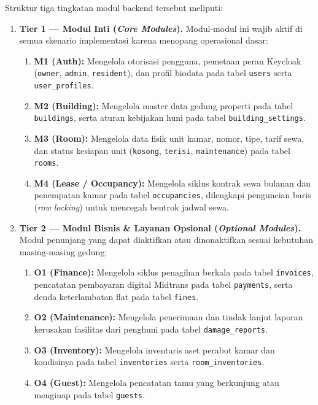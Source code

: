 Struktur tiga tingkatan modul backend tersebut meliputi:
\begin{enumerate}[label=\arabic*., leftmargin=*]
  \item \textbf{Tier 1 --- Modul Inti (\textit{Core Modules}).} Modul-modul ini wajib aktif di semua skenario implementasi karena menopang operasional dasar:
    \begin{enumerate}[label=\alph*., leftmargin=*]
      \item \textbf{M1 (Auth):} Mengelola otorisasi pengguna, pemetaan peran Keycloak (\texttt{owner}, \texttt{admin}, \texttt{resident}), dan profil biodata pada tabel \texttt{users} serta \texttt{user\_profiles}.
      \item \textbf{M2 (Building):} Mengelola master data gedung properti pada tabel \texttt{buildings}, serta aturan kebijakan huni pada tabel \texttt{building\_settings}.
      \item \textbf{M3 (Room):} Mengelola data fisik unit kamar, nomor, tipe, tarif sewa, dan status kesiapan unit (\texttt{kosong}, \texttt{terisi}, \texttt{maintenance}) pada tabel \texttt{rooms}.
      \item \textbf{M4 (Lease / Occupancy):} Mengelola siklus kontrak sewa bulanan dan penempatan kamar pada tabel \texttt{occupancies}, dilengkapi penguncian baris (\textit{row locking}) untuk mencegah bentrok jadwal sewa.
    \end{enumerate}
  \item \textbf{Tier 2 --- Modul Bisnis \& Layanan Opsional (\textit{Optional Modules}).} Modul penunjang yang dapat diaktifkan atau dinonaktifkan sesuai kebutuhan masing-masing gedung:
    \begin{enumerate}[label=\alph*., leftmargin=*]
      \item \textbf{O1 (Finance):} Mengelola siklus penagihan berkala pada tabel \texttt{invoices}, pencatatan pembayaran digital Midtrans pada tabel \texttt{payments}, serta denda keterlambatan flat pada tabel \texttt{fines}.
      \item \textbf{O2 (Maintenance):} Mengelola penerimaan dan tindak lanjut laporan kerusakan fasilitas dari penghuni pada tabel \texttt{damage\_reports}.
      \item \textbf{O3 (Inventory):} Mengelola inventaris aset perabot kamar dan kondisinya pada tabel \texttt{inventories} serta \texttt{room\_inventories}.
      \item \textbf{O4 (Guest):} Mengelola pencatatan tamu yang berkunjung atau menginap pada tabel \texttt{guests}.

\end{enumerate}
\end{enumerate}
